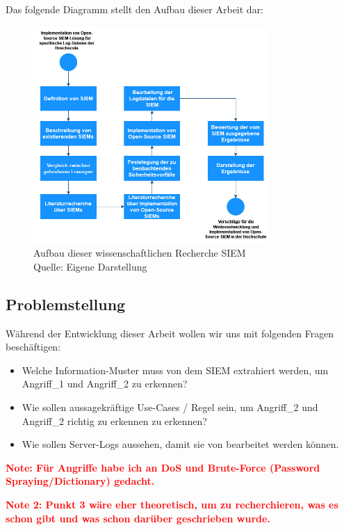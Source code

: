 Das folgende Diagramm stellt den Aufbau dieser Arbeit dar:

\begin{figure}[H]
   \centering
   \includegraphics[width=0.8\textwidth]{assets/1_p1.jpg}
   \caption{Aufbau dieser wissenschaftlichen Recherche \gls{SIEM} \\Quelle: Eigene Darstellung }
   \centering
\end{figure}

\subsection{Problemstellung}
Während der Entwicklung dieser Arbeit wollen wir uns mit folgenden Fragen beschäftigen:

\begin{itemize}
   \item Welche Information-Muster muss von dem \gls{SIEM} extrahiert werden, um Angriff\_1 und Angriff\_2 zu erkennen?
   \item Wie sollen aussagekräftige Use-Cases / Regel sein, um Angriff\_2 und Angriff\_2 richtig zu erkennen zu erkennen?
   \item Wie sollen Server-Logs aussehen, damit sie von  bearbeitet werden können.
\end{itemize}

\textcolor{red}{\textbf{Note: Für Angriffe habe ich an DoS und Brute-Force (Password Spraying/Dictionary) gedacht.}}


\textcolor{red}{\textbf{Note 2: Punkt 3 wäre eher theoretisch, um zu recherchieren, was es schon gibt und was schon darüber geschrieben wurde.}}

